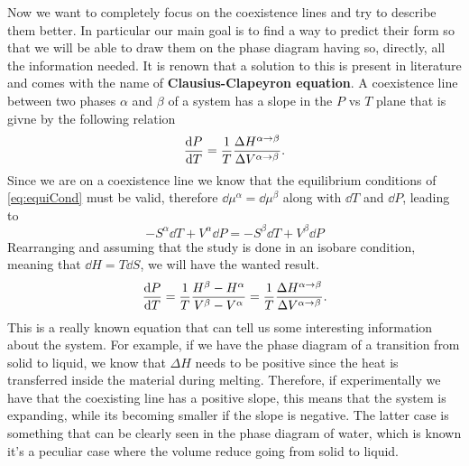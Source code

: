 Now we want to completely focus on the coexistence lines and try to describe them better. In particular our main goal is to find a way to predict their form so that we will be able to draw them on the phase diagram having so, directly, all the information needed. It is renown that a solution to this is present in literature and comes with the name of \textbf{Clausius-Clapeyron equation}.
{
    A coexistence line between two phases $\alpha$ and $\beta$ of a system has a slope in the $P$ vs $T$ plane that is givne by the following relation
    \begin{equation}
        \label{eq:CCequetion}
        \dv{P}{T} = \frac{1}{T}\frac{\Delta H^{\alpha \to \beta}}{\Delta V^{\alpha\to \beta}}.
    \end{equation}
}
{
    Since we are on a coexistence line we know that the equilibrium conditions of \eqref{eq:equiCond} must be valid, therefore $\dd \mu^\alpha = \dd \mu^\beta$ along with $\dd T$ and $\dd P$, leading to
    \begin{equation}
        -S^\alpha \dd T + V^\alpha \dd P = -S^\beta \dd T + V^\beta \dd P
    \end{equation}
    Rearranging and assuming that the study is done in an isobare condition, meaning that $\dd H = T\dd S$, we will have the wanted result.
    \begin{equation}
        \dv{P}{T} = \frac{1}{T}\frac{H^\beta - H^\alpha}{V^\beta - V^\alpha} = \frac{1}{T}\frac{\Delta H^{\alpha \to \beta}}{\Delta V^{\alpha\to \beta}}.
    \end{equation}
}
\noindent
This is a really known equation that can tell us some interesting information about the system. For example, if we have the phase diagram of a transition from solid to liquid, we know that $\Delta H$ needs to be positive since the heat is transferred inside the material during melting. Therefore, if experimentally we have that the coexisting line has a positive slope, this means that the system is expanding, while its becoming smaller if the slope is negative. The latter case is something that can be clearly seen in the phase diagram of water, which is known it's a peculiar case where the volume reduce going from solid to liquid.


